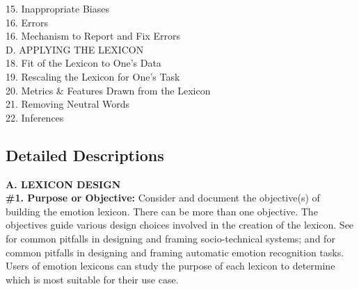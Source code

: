 \documentclass[11pt]{article}
\begin{document}
\hspace*{3mm}  15. Inappropriate Biases\\
\hspace*{3mm}  16. Errors\\
\hspace*{3mm}  16. Mechanism to Report and Fix Errors\\[4pt]
\noindent D. APPLYING THE LEXICON\\[2pt]
\hspace*{3mm}  18. Fit of the Lexicon to One's Data\\
\hspace*{3mm}  19. Rescaling the Lexicon for One's Task\\
\hspace*{3mm}  20. Metrics \& Features Drawn from the Lexicon\\
\hspace*{3mm}  21. Removing Neutral Words\\
\hspace*{3mm}  22. Inferences \\%

\vspace*{-5mm}
\subsection{Detailed Descriptions}

\noindent \textbf{A. LEXICON DESIGN}\\[-8pt]

\noindent \textbf{\#1. Purpose or Objective:} Consider and document the objective(s) of building the emotion lexicon. There can be more than one objective. 
The objectives guide various design choices involved in the creation of the lexicon. 
 See  for common pitfalls in designing and framing socio-technical systems; and  for common pitfalls in designing and framing automatic emotion recognition tasks.  Users of emotion lexicons can study the purpose of each lexicon to determine which is most suitable for their use case.
\end{document}

